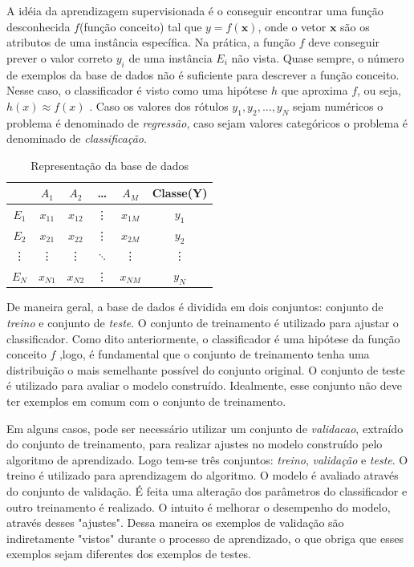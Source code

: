 A idéia da aprendizagem supervisionada é o conseguir encontrar uma função desconhecida $f$(função conceito) tal que $y=f(\mathbf{x})$, onde o vetor $\mathbf{x}$ são os atributos de uma instância específica. Na prática, a função $f$ deve conseguir prever o valor correto $y_i$ de uma instância $E_i$ não vista. Quase sempre, o número de exemplos da base de dados não é suficiente para descrever a função conceito. Nesse caso, o classificador é visto como uma hipótese $h$ que aproxima $f$, ou seja, $h(x)\approx f(x)$ . Caso os valores dos rótulos $y_1,y_2,...,y_N$ sejam numéricos o problema é denominado de \textit{regressão}, caso sejam valores categóricos o problema é denominado de \textit{classificação}. 

\begin{table}[]
	\centering
	\begin{tabular}{c|cccc|c}
		\hline
		& $A_1$ & $A_2$ & \dots & $A_M$  & Classe(Y) \\
		\hline 
		\hline
		$E_1$ & $x_{11}$ & $x_{12}$ & \vdots & $x_{1M}$ & $y_1$ \\
		$E_2$ & $x_{21}$ & $x_{22}$ & \vdots & $x_{2M}$ & $y_2$ \\
		\vdots & \vdots & \vdots &  $\ddots$ & \vdots & \vdots \\
		$E_N$ & $x_{N1}$ & $x_{N2}$ & \vdots & $x_{NM}$ & $y_N$ \\
		\hline
		
		
	\end{tabular}	
	\caption{Representação da base de dados}
	\label{table-dataset}
\end{table}


De maneira geral, a base de dados é dividida em dois conjuntos: conjunto de \textit{treino} e conjunto de \textit{teste}. O conjunto de treinamento é utilizado para ajustar o classificador. Como dito anteriormente, o classificador é uma hipótese da função conceito $f$ ,logo, é fundamental que o conjunto de treinamento tenha uma distribuição o mais semelhante possível do conjunto original.  O conjunto de teste é utilizado para avaliar o modelo construído. Idealmente, esse conjunto não deve ter exemplos em comum com o conjunto de treinamento.

Em alguns casos, pode ser necessário utilizar um conjunto de \textit{validacao}, extraído do conjunto de treinamento, para realizar ajustes no modelo construído pelo algoritmo de aprendizado. Logo tem-se três conjuntos: \textit{treino}, \textit{validação} e \textit{teste}. O treino é utilizado para aprendizagem do algoritmo. O modelo é avaliado através do conjunto de validação. É feita uma alteração dos parâmetros do classificador e outro treinamento é realizado. O intuito é melhorar o desempenho do modelo, através desses "ajustes". Dessa maneira os exemplos de validação são indiretamente "vistos" durante o processo de aprendizado, o que obriga que esses exemplos sejam diferentes dos exemplos de testes.

